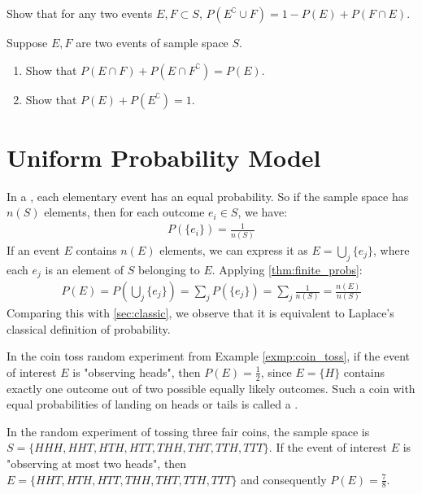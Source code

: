 \begin{ex}
	Show that for any two events \( E, F \subset S \), \( P(E^\complement \cup F) = 1 - P(E) + P(F \cap E) \).
\end{ex}
\begin{ex}\label{ex:marginal_probs}
	Suppose \( E, F \) are two events of sample space \( S \).
	\begin{enumerate}
		\item Show that \( P(E \cap F) + P(E \cap F^\complement) = P(E) \).
		\item Show that \( P(E) + P(E^\complement) = 1 \).
	\end{enumerate}
\end{ex}

\section{Uniform Probability Model}

In a , each elementary event has an equal probability.
So if the sample space has \( n(S) \) elements, then for each outcome \( e_i \in S \), we have:
\begin{align*}
	P(\{e_i\}) = \frac{1}{n(S)}
\end{align*}
If an event \( E \) contains \( n(E) \) elements,
we can express it as \( E = \bigcup_{j} \{e_j\} \), where each \( e_j \) is an element of \( S \) belonging to \( E \).
Applying \autoref{thm:finite_probs}:
\begin{align*}
	P(E) = P(\bigcup_{j} \{e_j\}) = \sum_{j} P(\{e_j\}) = \sum_{j} \frac{1}{n(S)} = \frac{n(E)}{n(S)}
\end{align*}
Comparing this with \autoref{sec:classic}, we observe that it is equivalent to Laplace's classical definition of probability.

\begin{exmp}
	In the coin toss random experiment from Example \autoref{exmp:coin_toss}, if the event of interest \( E \) is "observing heads",
	then \( P(E) = \frac{1}{2} \), since \( E = \{ H \} \) contains exactly one outcome out of two possible equally likely outcomes.
	Such a coin with equal probabilities of landing on heads or tails is called a .
\end{exmp}

\begin{exmp}\label{exmp:three_fair_coins}
	In the random experiment of tossing three fair coins, the sample space is
	\( S = \{ HHH, HHT, HTH, HTT, THH, THT, TTH, TTT \} \).
	If the event of interest \( E \) is "observing at most two heads",
	then \( E = \{ HHT, HTH, HTT, THH, THT, TTH, TTT \} \) and consequently \( P(E) = \frac{7}{8} \).
\end{exmp}

